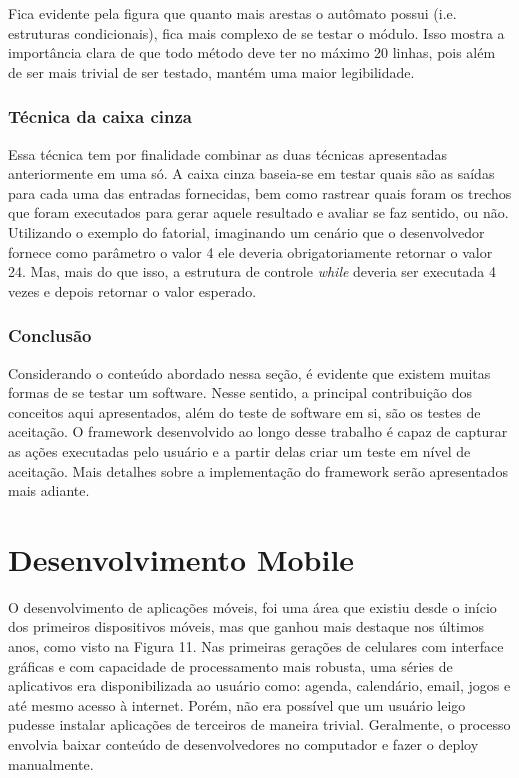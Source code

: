 \documentclass[
    12pt,       %
    openright,      %
    twoside,      %
    a4paper,      %
    english,      %
    french,       %
    spanish,      %
    brazil,       %
    ]{abntex2}
\begin{document}
              Fica evidente pela figura que quanto mais arestas o autômato possui (i.e. estruturas
              condicionais), fica mais complexo de se testar o módulo. Isso mostra a importância clara de
              que todo método deve ter no máximo 20 linhas, pois além de ser mais trivial de ser testado,
              mantém uma maior legibilidade.

          \subsection{Técnica da caixa cinza}
              Essa técnica tem por finalidade combinar as duas técnicas apresentadas anteriormente em uma
              só. A caixa cinza baseia-se em testar quais são as saídas para cada uma das entradas
              fornecidas, bem como rastrear quais foram os trechos que foram executados para gerar aquele
              resultado e avaliar se faz sentido, ou não. Utilizando o exemplo do fatorial, imaginando
              um cenário que o desenvolvedor fornece como parâmetro o valor 4 ele deveria obrigatoriamente
              retornar o valor 24. Mas, mais do que isso, a estrutura de controle \textit{while} deveria
              ser executada 4 vezes e depois retornar o valor esperado.

            \subsection{Conclusão}
              Considerando o conteúdo abordado nessa seção, é evidente que existem muitas formas de se testar um
              software. Nesse sentido, a principal contribuição dos conceitos aqui apresentados, além do
              teste de software em si, são os testes de aceitação. O framework desenvolvido ao longo
              desse trabalho é capaz de capturar as ações executadas pelo usuário e a partir delas criar
              um teste em nível de aceitação. Mais detalhes sobre a implementação do framework serão apresentados
              mais adiante.

  \chapter{Desenvolvimento Mobile}

      O desenvolvimento de aplicações móveis, foi uma área que existiu desde o início dos
      primeiros dispositivos móveis, mas que ganhou mais destaque nos últimos anos, como visto na
      Figura 11. Nas primeiras gerações de celulares com interface gráficas e com capacidade
      de processamento mais robusta, uma séries de aplicativos era disponibilizada ao usuário como:
      agenda, calendário, email, jogos e até mesmo acesso à internet. Porém, não era possível que
      um usuário leigo pudesse instalar aplicações de terceiros de maneira trivial. Geralmente, o
      processo envolvia baixar conteúdo de desenvolvedores no computador e fazer o deploy manualmente.
\end{document}
